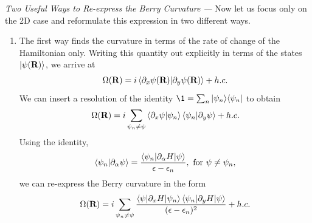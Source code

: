 \begin{shaded}
{\it Two Useful Ways to Re-express the Berry Curvature ---} Now let us focus only on the 2D case and reformulate this expression in two different ways.

\begin{enumerate}
    \item The first way finds the curvature in terms of the rate of change of the Hamiltonian only. Writing this quantity out explicitly in terms of the states $\ket{\psi(\textbf R)}$, we arrive at
    \begin{align}\label{berry_curvature_state_deriv}
        \Omega(\textbf R) = i \braket{  \partial_x \psi(\textbf R) | \partial_y \psi(\textbf R)} + h.c.
    \end{align}
    We can insert a resolution of the identity $\1 = \sum_n \ketbra{\psi_n}{\psi_n}$ to obtain
    \begin{align}
        \Omega(\textbf R) = i \sum_{\psi_n \neq \psi} \braket{  \partial_x \psi|\psi_n }\braket{ \psi_n|\partial_y \psi} + h.c.
    \end{align}
    Using the identity, 
    \begin{align}
        \braket{\psi_n | \partial_\alpha \psi} = \frac{
            \braket{\psi_n | \partial_\alpha H | \psi}
        }{
            \epsilon - \epsilon_n
        }, \ \textup{for } \psi \neq \psi_n,
    \end{align}
    we can re-express the Berry curvature in the form
    \begin{align} \label{eqn:berry_curvature_hamiltonian}
        \Omega(\textbf R) = i \sum_{\psi_n \neq \psi} 
        \frac{
            \braket{ \psi|\partial_x H|\psi_n }\braket{ \psi_n| \partial_y H |\psi}
        }{
            (\epsilon - \epsilon_n)^2
        } + h.c.
    \end{align}


\end{enumerate}
\end{shaded}
